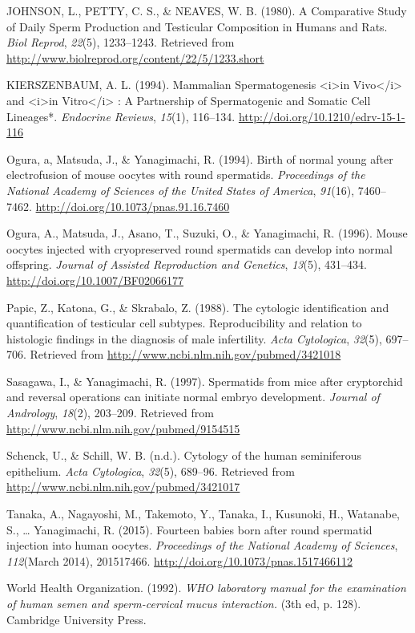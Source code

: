 \documentclass[12pt,twoside]{reedthesis}
\theoremstyle{definition}
\theoremstyle{definition}
\theoremstyle{remark}
\begin{document}
  \hypertarget{ref-Johnson1980}{}
  JOHNSON, L., PETTY, C. S., \& NEAVES, W. B. (1980). A Comparative Study
  of Daily Sperm Production and Testicular Composition in Humans and Rats.
  \emph{Biol Reprod}, \emph{22}(5), 1233--1243. Retrieved from
  \url{http://www.biolreprod.org/content/22/5/1233.short}
  
  \hypertarget{ref-KIERSZENBAUM1994}{}
  KIERSZENBAUM, A. L. (1994). Mammalian Spermatogenesis
  \textless{}i\textgreater{}in Vivo\textless{}/i\textgreater{} and
  \textless{}i\textgreater{}in Vitro\textless{}/i\textgreater{} : A
  Partnership of Spermatogenic and Somatic Cell Lineages*. \emph{Endocrine
  Reviews}, \emph{15}(1), 116--134.
  \url{http://doi.org/10.1210/edrv-15-1-116}
  
  \hypertarget{ref-Ogura1994}{}
  Ogura, a, Matsuda, J., \& Yanagimachi, R. (1994). Birth of normal young
  after electrofusion of mouse oocytes with round spermatids.
  \emph{Proceedings of the National Academy of Sciences of the United
  States of America}, \emph{91}(16), 7460--7462.
  \url{http://doi.org/10.1073/pnas.91.16.7460}
  
  \hypertarget{ref-Kimura1995}{}
  Ogura, A., Matsuda, J., Asano, T., Suzuki, O., \& Yanagimachi, R.
  (1996). Mouse oocytes injected with cryopreserved round spermatids can
  develop into normal offspring. \emph{Journal of Assisted Reproduction
  and Genetics}, \emph{13}(5), 431--434.
  \url{http://doi.org/10.1007/BF02066177}
  
  \hypertarget{ref-Papic}{}
  Papic, Z., Katona, G., \& Skrabalo, Z. (1988). The cytologic
  identification and quantification of testicular cell subtypes.
  Reproducibility and relation to histologic findings in the diagnosis of
  male infertility. \emph{Acta Cytologica}, \emph{32}(5), 697--706.
  Retrieved from \url{http://www.ncbi.nlm.nih.gov/pubmed/3421018}
  
  \hypertarget{ref-Sasagawa}{}
  Sasagawa, I., \& Yanagimachi, R. (1997). Spermatids from mice after
  cryptorchid and reversal operations can initiate normal embryo
  development. \emph{Journal of Andrology}, \emph{18}(2), 203--209.
  Retrieved from \url{http://www.ncbi.nlm.nih.gov/pubmed/9154515}
  
  \hypertarget{ref-Schenck}{}
  Schenck, U., \& Schill, W. B. (n.d.). Cytology of the human seminiferous
  epithelium. \emph{Acta Cytologica}, \emph{32}(5), 689--96. Retrieved
  from \url{http://www.ncbi.nlm.nih.gov/pubmed/3421017}
  
  \hypertarget{ref-Tanaka2015}{}
  Tanaka, A., Nagayoshi, M., Takemoto, Y., Tanaka, I., Kusunoki, H.,
  Watanabe, S., \ldots{} Yanagimachi, R. (2015). Fourteen babies born
  after round spermatid injection into human oocytes. \emph{Proceedings of
  the National Academy of Sciences}, \emph{112}(March 2014), 201517466.
  \url{http://doi.org/10.1073/pnas.1517466112}
  
  \hypertarget{ref-WorldHealthOrganization1992}{}
  World Health Organization. (1992). \emph{WHO laboratory manual for the
  examination of human semen and sperm-cervical mucus interaction.} (3th
  ed, p. 128). Cambridge University Press.


\end{document}
